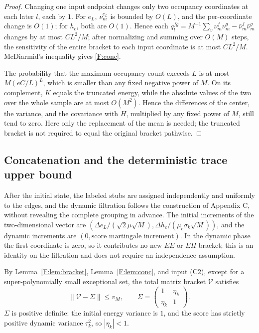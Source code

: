 \documentclass[a4paper,11pt]{article}
\numberwithin{equation}{section}
\begin{document}
\begin{proof}
Changing one input endpoint changes only two occupancy coordinates at each later $l$, each by $1$. For $e_L$,
$\nu^{e_L}_m$ is bounded by $O(L)$, and the per-coordinate change is $O(1)$; for $h_c$, both are $O(1)$. Hence
each $q_l^{fg}=M^{-1}\sum_v\nu^f_m\nu^g_m-\bar\nu^f_m\bar\nu^g_m$ changes by at most $CL^2/M$; after
normalizing and summing over $O(M)$ steps, the sensitivity of the entire bracket to each input coordinate is
at most $CL^2/M$. McDiarmid's inequality gives \eqref{F:conc}.

The probability that the maximum occupancy count exceeds $L$ is at most $M(eC/L)^L$, which is smaller than any
fixed negative power of $M$. On its complement, $K$ equals the truncated energy, while the absolute values of
the two over the whole sample are at most $O(M^2)$. Hence the differences of the center, the variance, and the
covariance with $H$, multiplied by any fixed power of $M$, still tend to zero. Here only the replacement of the
mean is needed; the truncated bracket is not required to equal the original bracket pathwise.
\end{proof}

\subsection{Concatenation and the deterministic trace upper bound}

After the initial state, the labeled stubs are assigned independently and uniformly to the edges, and the
dynamic filtration follows the construction of Appendix C, without revealing the complete grouping in advance.
The initial increments of the two-dimensional vector are
$(\Delta e_L/(\sqrt2\mu\sqrt M),\Delta h_c/(\mu_c\sigma_k\sqrt M))$, and the dynamic increments are
$(0,\text{score martingale increment})$. In the dynamic phase the first coordinate is zero, so it contributes
no new $EE$ or $EH$ bracket; this is an identity on the filtration and does not require an independence
assumption.

By Lemma~\ref{F:lem:bracket}, Lemma~\ref{F:lem:conc}, and input (C2), except for a super-polynomially small
exceptional set, the total matrix bracket $\mathcal V$ satisfies
\begin{equation}
\|\mathcal V-\Sigma\|\le v_M,\qquad \Sigma=\begin{pmatrix}1&\eta_k\\\eta_k&1\end{pmatrix}.\label{F:Sigma}
\end{equation}
$\Sigma$ is positive definite: the initial energy variance is $1$, and the score has strictly positive dynamic
variance $\tau_k^2$, so $|\eta_k|<1$.
\end{document}
